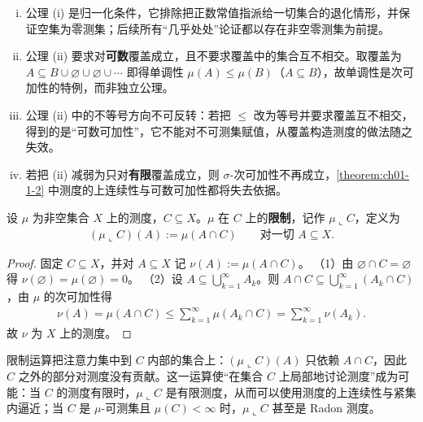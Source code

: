 \documentclass[../../main.tex]{subfiles}
\begin{document}
\begin{remark}\label{remark:ch01-def-1-1-测度条件}
\begin{enumerate}[(i)]
\item 公理 (i) 是归一化条件，它排除把正数常值指派给一切集合的退化情形，并保证空集为零测集；后续所有“几乎处处”论证都以存在非空零测集为前提。
\item 公理 (ii) 要求对\textbf{可数}覆盖成立，且不要求覆盖中的集合互不相交。取覆盖为 $A\subseteq B\cup\varnothing\cup\varnothing\cup\cdots$ 即得单调性 $\mu(A)\leqslant\mu(B)$（$A\subseteq B$），故单调性是次可加性的特例，而非独立公理。
\item 公理 (ii) 中的不等号方向不可反转：若把 $\leqslant$ 改为等号并要求覆盖互不相交，得到的是“可数可加性”，它不能对不可测集赋值，从覆盖构造测度的做法随之失效。
\item 若把 (ii) 减弱为只对\textbf{有限}覆盖成立，则 $\sigma$-次可加性不再成立，\cref{theorem:ch01-1-2} 中测度的上连续性与可数可加性都将失去依据。%
\end{enumerate}
\end{remark}

\begin{definition}[测度在集合上的限制]\label{definition:ch01-1-2}
设 $\mu$ 为非空集合 $X$ 上的测度，$C\subseteq X$。$\mu$ 在 $C$ 上的\textbf{限制}，记作 $\mu\llcorner C$，定义为
\begin{align*}
(\mu\llcorner C)(A):=\mu(A\cap C)\qquad\text{对一切 }A\subseteq X.
\end{align*}
\end{definition}

\begin{proof}
固定 $C\subseteq X$，并对 $A\subseteq X$ 记 $\nu(A):=\mu(A\cap C)$。
（1）由 $\varnothing\cap C=\varnothing$ 得 $\nu(\varnothing)=\mu(\varnothing)=0$。
（2）设 $A\subseteq\bigcup_{k=1}^{\infty}A_{k}$。则 $A\cap C\subseteq\bigcup_{k=1}^{\infty}(A_{k}\cap C)$，由 $\mu$ 的次可加性得
\begin{align*}
\nu(A)=\mu(A\cap C)\leqslant\sum_{k=1}^{\infty}\mu(A_{k}\cap C)=\sum_{k=1}^{\infty}\nu(A_{k}).
\end{align*}
故 $\nu$ 为 $X$ 上的测度。
\end{proof}

\begin{remark}\label{remark:ch01-def-1-2-限制动机}
限制运算把注意力集中到 $C$ 内部的集合上：$(\mu\llcorner C)(A)$ 只依赖 $A\cap C$，因此 $C$ 之外的部分对测度没有贡献。这一运算使“在集合 $C$ 上局部地讨论测度”成为可能：当 $C$ 的测度有限时，$\mu\llcorner C$ 是有限测度，从而可以使用测度的上连续性与紧集内逼近；当 $C$ 是 $\mu$-可测集且 $\mu(C)<\infty$ 时，$\mu\llcorner C$ 甚至是 Radon 测度。
\end{remark}
\end{document}
